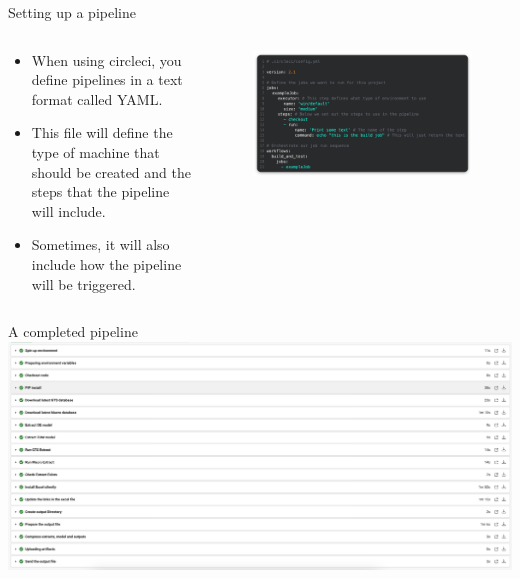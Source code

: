 \documentclass[aspectratio=169]{beamer}
\begin{document}
\begin{frame}{Setting up a pipeline}

\begin{columns}
	\begin{column}{0.4\textwidth}
		\begin{itemize}
			\item When using circleci, you define pipelines in a text format called YAML.
			\item This file will define the type of machine that should be created and the steps that the pipeline will include.
			\item Sometimes, it will also include how the pipeline will be triggered.
		\end{itemize}
	\end{column}
	
	\begin{column}{0.5\textwidth}
		\begin{figure}
		\centering
		\includegraphics[scale=0.21]{graphics/pipeline-yaml-example.png}	
	\end{figure}
	\end{column}	
\end{columns}




			
\end{frame}

\begin{frame}{A completed pipeline}
\includegraphics[scale=0.3]{graphics/pipeline-example}

\end{frame}
\end{document}
